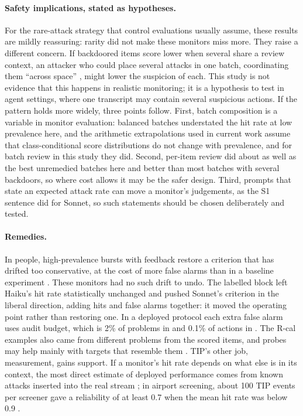 \documentclass[letterpaper]{article} %
\begin{document}
\paragraph{Safety implications, stated as hypotheses.} For the rare-attack strategy that control evaluations usually assume, these results are mildly reassuring: rarity did not make these monitors miss more. They raise a different concern. If backdoored items score lower when several share a review context, an attacker who could place several attacks in one batch, coordinating them ``across space'' \citep[Sec.~6]{korbak2025}, might lower the suspicion of each. This study is not evidence that this happens in realistic monitoring; it is a hypothesis to test in agent settings, where one transcript may contain several suspicious actions. If the pattern holds more widely, three points follow. First, batch composition is a variable in monitor evaluation: balanced batches understated the hit rate at low prevalence here, and the arithmetic extrapolations used in current work \citep{abbasi2026,srivastav2026} assume that class-conditional score distributions do not change with prevalence, and for batch review in this study they did. Second, per-item review did about as well as the best unremedied batches here and better than most batches with several backdoors, so where cost allows it may be the safer design. Third, prompts that state an expected attack rate can move a monitor's judgements, as the S1 sentence did for Sonnet, so such statements should be chosen deliberately and tested.

\paragraph{Remedies.} In people, high-prevalence bursts with feedback restore a criterion that has drifted too conservative, at the cost of more false alarms than in a baseline experiment \citep[Experiment~7]{wolfe2007}. These monitors had no such drift to undo. The labelled block left Haiku's hit rate statistically unchanged and pushed Sonnet's criterion in the liberal direction, adding hits and false alarms together: it moved the operating point rather than restoring one. In a deployed protocol each extra false alarm uses audit budget, which is 2\% of problems in \citet{greenblatt2024} and 0.1\% of actions in \citet{korbak2025}. The R-cal examples also came from different problems from the scored items, and probes may help mainly with targets that resemble them \citep{becker2026}. TIP's other job, measurement, gains support. If a monitor's hit rate depends on what else is in its context, the most direct estimate of deployed performance comes from known attacks inserted into the real stream \citep{korbak2025}; in airport screening, about 100 TIP events per screener gave a reliability of at least 0.7 when the mean hit rate was below 0.9 \citep{buser2025}.
\end{document}
